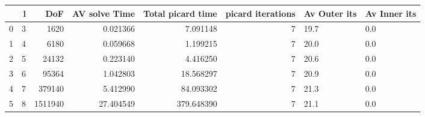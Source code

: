 \begin{tabular}{lrrrrrll}
\toprule
{} &  l &      DoF &  AV solve Time &  Total picard time &  picard iterations & Av Outer its & Av Inner its \\
\midrule
0 &  3 &     1620 &       0.021366 &           7.091148 &                  7 &         19.7 &          0.0 \\
1 &  4 &     6180 &       0.059668 &           1.199215 &                  7 &         20.0 &          0.0 \\
2 &  5 &    24132 &       0.223140 &           4.416250 &                  7 &         20.6 &          0.0 \\
3 &  6 &    95364 &       1.042803 &          18.568297 &                  7 &         20.9 &          0.0 \\
4 &  7 &   379140 &       5.412990 &          84.093302 &                  7 &         21.3 &          0.0 \\
5 &  8 &  1511940 &      27.404549 &         379.648390 &                  7 &         21.1 &          0.0 \\
\bottomrule
\end{tabular}

